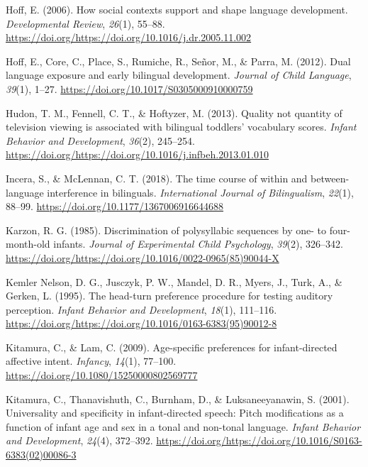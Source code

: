 \documentclass[,man,floatsintext]{apa6}
\begin{document}
\leavevmode\hypertarget{ref-hoff_2006}{}%
Hoff, E. (2006). How social contexts support and shape language development. \emph{Developmental Review}, \emph{26}(1), 55--88. \url{https://doi.org/https://doi.org/10.1016/j.dr.2005.11.002}

\leavevmode\hypertarget{ref-hoff_2012}{}%
Hoff, E., Core, C., Place, S., Rumiche, R., Señor, M., \& Parra, M. (2012). Dual language exposure and early bilingual development. \emph{Journal of Child Language}, \emph{39}(1), 1--27. \url{https://doi.org/10.1017/S0305000910000759}

\leavevmode\hypertarget{ref-hudon_2013}{}%
Hudon, T. M., Fennell, C. T., \& Hoftyzer, M. (2013). Quality not quantity of television viewing is associated with bilingual toddlers' vocabulary scores. \emph{Infant Behavior and Development}, \emph{36}(2), 245--254. \url{https://doi.org/https://doi.org/10.1016/j.infbeh.2013.01.010}

\leavevmode\hypertarget{ref-incera_2018}{}%
Incera, S., \& McLennan, C. T. (2018). The time course of within and between-language interference in bilinguals. \emph{International Journal of Bilingualism}, \emph{22}(1), 88--99. \url{https://doi.org/10.1177/1367006916644688}

\leavevmode\hypertarget{ref-karzon_1985}{}%
Karzon, R. G. (1985). Discrimination of polysyllabic sequences by one- to four-month-old infants. \emph{Journal of Experimental Child Psychology}, \emph{39}(2), 326--342. \url{https://doi.org/https://doi.org/10.1016/0022-0965(85)90044-X}

\leavevmode\hypertarget{ref-kemler_nelson_1995}{}%
Kemler Nelson, D. G., Jusczyk, P. W., Mandel, D. R., Myers, J., Turk, A., \& Gerken, L. (1995). The head-turn preference procedure for testing auditory perception. \emph{Infant Behavior and Development}, \emph{18}(1), 111--116. \url{https://doi.org/https://doi.org/10.1016/0163-6383(95)90012-8}

\leavevmode\hypertarget{ref-kitamura_2009}{}%
Kitamura, C., \& Lam, C. (2009). Age-specific preferences for infant-directed affective intent. \emph{Infancy}, \emph{14}(1), 77--100. \url{https://doi.org/10.1080/15250000802569777}

\leavevmode\hypertarget{ref-kitamura_2001}{}%
Kitamura, C., Thanavishuth, C., Burnham, D., \& Luksaneeyanawin, S. (2001). Universality and specificity in infant-directed speech: Pitch modifications as a function of infant age and sex in a tonal and non-tonal language. \emph{Infant Behavior and Development}, \emph{24}(4), 372--392. \url{https://doi.org/https://doi.org/10.1016/S0163-6383(02)00086-3}
\end{document}
